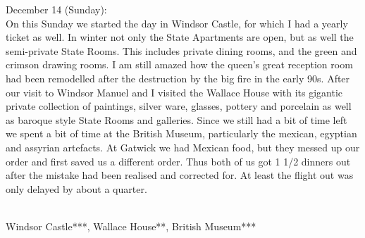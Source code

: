 December 14 (Sunday):\\
On this Sunday we started the day in Windsor Castle, for which I had a yearly ticket as well. In winter not only the State Apartments are open, but as well the semi-private State Rooms. This includes private dining rooms, and the green and crimson drawing rooms. I am still amazed how the queen's great reception room had been remodelled after the destruction by the big fire in the early 90s. After our visit to Windsor Manuel and I visited the Wallace House with its gigantic private collection of paintings, silver ware, glasses, pottery and porcelain as well as baroque style State Rooms and galleries. Since we still had a bit of time left we spent a bit of time at the British Museum, particularly the mexican, egyptian and assyrian artefacts. At Gatwick we had Mexican food, but they messed up our order and first saved us a different order. Thus both of us got 1 1/2 dinners out after the mistake had been realised and corrected for. At least the flight out was only delayed by about a quarter.\\\

Windsor Castle***, Wallace House**, British Museum***